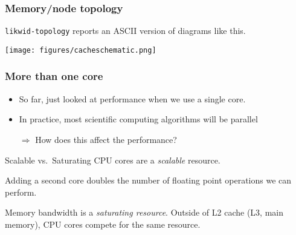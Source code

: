 \documentclass[dvipsnames,presentation,aspectratio=169,14pt]{beamer}
\begin{document}
\begin{frame}
\begin{center}
  \end{center}
\end{frame}
\begin{frame}
  \frametitle{Memory/node topology}
  \texttt{likwid-topology} reports an ASCII version of diagrams like
  this.
  \begin{center}
    \texttt{[image: figures/cacheschematic.png]}
  \end{center}
\end{frame}

\begin{frame}
  \frametitle{More than one core}
  \begin{itemize}
  \item So far, just looked at performance when we use a single core.
  \item In practice, most scientific computing algorithms will be
    parallel
  \item[$\Rightarrow$] How does this affect the performance?
  \end{itemize}

  \begin{answer}{Scalable vs.~Saturating}
    CPU cores are a \emph{scalable} resource.

    Adding a second core doubles the number of floating point
    operations we can perform.

    Memory bandwidth is a \emph{saturating resource}. Outside of L2
    cache (L3, main memory), CPU cores compete for the same resource.
  \end{answer}
\end{frame}
\end{document}
